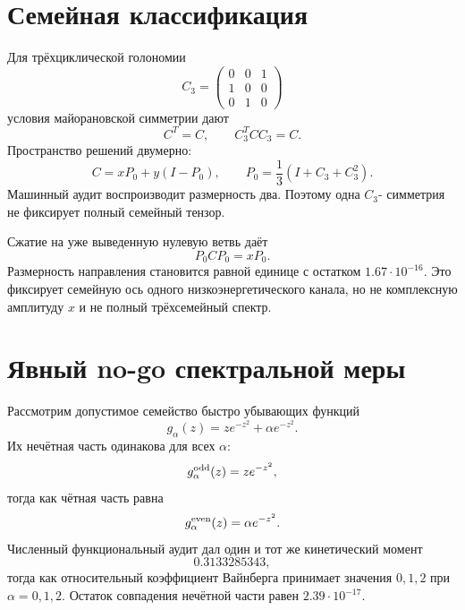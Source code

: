 \section{Семейная классификация}

Для трёхциклической голономии
\begin{equation}
 C_3=
 \begin{pmatrix}0&0&1\\1&0&0\\0&1&0\end{pmatrix}
\end{equation}
условия майорановской симметрии дают
\begin{equation}
 C^T=C,
 \qquad C_3^TCC_3=C.
\end{equation}
Пространство решений двумерно:
\begin{equation}
 C=xP_0+y(I-P_0),
 \qquad
 P_0=\frac13(I+C_3+C_3^2).
 \label{eq:v6-weinberg-family-tensor}
\end{equation}
Машинный аудит воспроизводит размерность два. Поэтому одна $C_3$-
симметрия не фиксирует полный семейный тензор.

Сжатие на уже выведенную нулевую ветвь даёт
\begin{equation}
 P_0CP_0=xP_0.
\end{equation}
Размерность направления становится равной единице с остатком
$1.67\cdot10^{-16}$. Это фиксирует семейную ось одного низкоэнергетического
канала, но не комплексную амплитуду $x$ и не полный трёхсемейный спектр.

\section{Явный no-go спектральной меры}

Рассмотрим допустимое семейство быстро убывающих функций
\begin{equation}
 g_\alpha(z)=ze^{-z^2}+\alpha e^{-z^2}.
 \label{eq:v6-weinberg-counterfamily}
\end{equation}
Их нечётная часть одинакова для всех $\alpha$:
\begin{equation}
 g_\alpha^{\rm odd}(z)=ze^{-z^2},
\end{equation}
тогда как чётная часть равна
\begin{equation}
 g_\alpha^{\rm even}(z)=\alpha e^{-z^2}.
\end{equation}
Численный функциональный аудит дал один и тот же кинетический момент
\begin{equation}
 0.3133285343,
\end{equation}
тогда как относительный коэффициент Вайнберга принимает значения
$0,1,2$ при $\alpha=0,1,2$. Остаток совпадения нечётной части равен
$2.39\cdot10^{-17}$.

